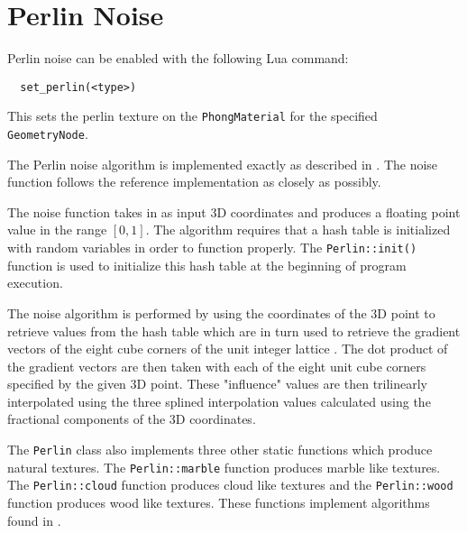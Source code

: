 \section{Perlin Noise}

Perlin noise can be enabled with the following Lua command:
\begin{lstlisting}
  set_perlin(<type>)
\end{lstlisting}
This sets the perlin texture on the \verb|PhongMaterial| for the specified 
\verb|GeometryNode|.

The Perlin noise algorithm is implemented exactly as described in
\cite{11_perlin_2002}. The noise function follows the reference implementation 
as closely as possibly.

The noise function takes in as input 3D coordinates and produces a floating
point value in the range $[0, 1]$. The algorithm requires that a hash table is
initialized with random variables in order to function properly. The
\verb|Perlin::init()| function is used to initialize this hash table at the
beginning of program execution.

The noise algorithm is performed by using the coordinates of the 3D point to 
retrieve values from the hash table which are in turn used to retrieve the 
gradient vectors of the eight cube corners of the unit integer lattice . The dot 
product of the gradient vectors are then taken with each of the eight unit cube 
corners specified by the given 3D point. These "influence" values are then
trilinearly interpolated using  the three splined interpolation values 
calculated using the fractional components of the 3D coordinates. 

The \verb|Perlin| class also implements three other static functions which
produce natural textures. The \verb|Perlin::marble| function produces marble
like textures. The \verb|Perlin::cloud| function produces cloud like textures
and the \verb|Perlin::wood| function produces wood like textures. These
functions implement algorithms found in \cite{7_kora_2007}. 

